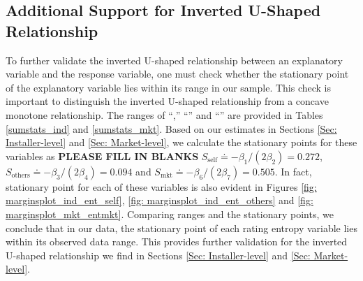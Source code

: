 \documentclass[msom,blindrev]{informs3}
\begin{document}
	
	
	
	
	\subsection{Additional Support for Inverted U-Shaped Relationship}
	
	To further validate the inverted U-shaped relationship between an explanatory variable and the response variable, one must check whether the stationary point of the explanatory variable lies within its range in our sample. This check is important to distinguish the inverted U-shaped relationship from a concave monotone relationship.  The ranges of ``,'' ``'' and ``'' are provided in Tables \ref{sumstats_ind} and \ref{sumstats_mkt}.
	Based on our estimates in Sections \ref{Sec: Installer-level} and \ref{Sec: Market-level}, we calculate the stationary points for these variables as \textbf{PLEASE FILL IN BLANKS} $S_{\text{self}} \doteq - \beta_{1}/ (2 \beta_{2}) = 0.272$, $S_{\text{others}} \doteq  - \beta_{3}/(2 \beta_{4}) =0.094 $ and $S_{\text{mkt}} \doteq - \beta_{6}/(2 \beta_{7}) =0.505 $. In fact, stationary point for each of these variables is also evident in Figures \ref{fig: marginsplot_ind_ent_self}, \ref{fig: marginsplot_ind_ent_others} and \ref{fig: marginsplot_mkt_entmkt}. Comparing ranges and the stationary points, we conclude that in our data, the stationary point of each rating entropy variable lies within its observed data range. This provides further validation for the inverted U-shaped relationship we find in Sections \ref{Sec: Installer-level} and \ref{Sec: Market-level}.
	
\end{document}

